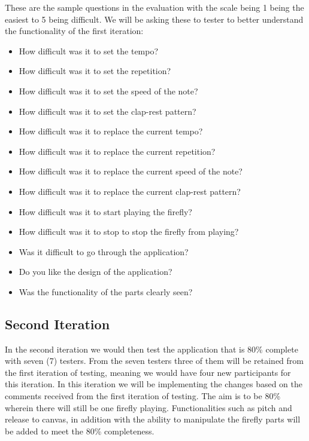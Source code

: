These are the sample questions in the evaluation with the scale being 1 being the easiest to 5 being difficult. We will be asking these to tester to better understand the functionality of the first iteration:

\begin{itemize}
    \item How difficult was it to set the tempo? 
    \item How difficult was it to set the repetition? 
    \item How difficult was it to set the speed of the note? 
    \item How difficult was it to set the clap-rest pattern? 
    \item How difficult was it to replace the current tempo? 
    \item How difficult was it to replace the current repetition? 
    \item How difficult was it to replace the current speed of the note? 
    \item How difficult was it to replace the current clap-rest pattern? 
    \item How difficult was it to start playing the firefly?
    \item How difficult was it to stop to stop the firefly from playing?
    \item Was it difficult to go through the application?
    \item Do you like the design of the application?
    \item Was the functionality of the parts clearly seen?
\end{itemize}

\subsection{Second Iteration}
In the second iteration we would then test the application that is 80\% complete with seven (7) testers. From the seven testers three of them will be retained from the first iteration of testing, meaning we would have four new participants for this iteration. In this iteration we will be implementing the changes based on the comments received from the first iteration of testing. The aim is to be 80\% wherein there will still be one firefly playing. Functionalities such as pitch and release to canvas, in addition with the ability to manipulate the firefly parts will be added to meet the 80\% completeness.

